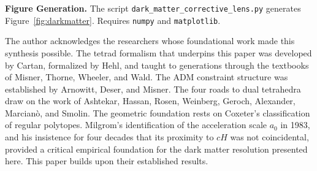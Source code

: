 \documentclass[aps,prd,preprint,superscriptaddress,showpacs,preprintnumbers,amsmath,amssymb,nofootinbib]{revtex4-2}
\begin{document}
\textbf{Figure Generation.}\quad
The script \texttt{dark\_matter\_corrective\_lens.py} generates Figure~\ref{fig:darkmatter}. Requires \texttt{numpy} and \texttt{matplotlib}.

\begin{acknowledgments}
The author acknowledges the researchers whose foundational work made this synthesis possible. The tetrad formalism that underpins this paper was developed by Cartan, formalized by Hehl, and taught to generations through the textbooks of Misner, Thorne, Wheeler, and Wald. The ADM constraint structure was established by Arnowitt, Deser, and Misner. The four roads to dual tetrahedra draw on the work of Ashtekar, Hassan, Rosen, Weinberg, Geroch, Alexander, Marcian\`o, and Smolin. The geometric foundation rests on Coxeter's classification of regular polytopes. Milgrom's identification of the acceleration scale $a_0$ in 1983, and his insistence for four decades that its proximity to $cH$ was not coincidental, provided a critical empirical foundation for the dark matter resolution presented here. This paper builds upon their established results.
\end{acknowledgments}
\end{document}
